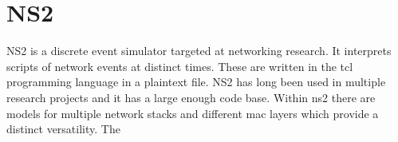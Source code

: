 \section{NS2}
NS2 is a discrete event simulator targeted at networking research. It interprets
scripts of network events at distinct times. These are written in the tcl
programming language in a plaintext file. NS2 has long been used in multiple
research projects and it has a large enough code base. Within ns2 there are
models for multiple network stacks and different mac layers which provide a
distinct versatility. The
